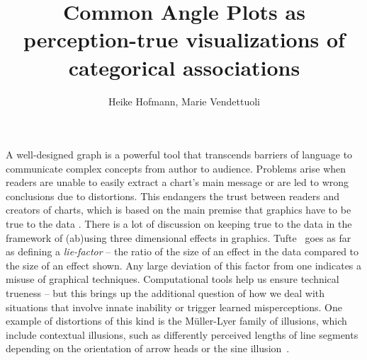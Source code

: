 \documentclass[journal]{vgtc}\usepackage{graphicx, color}
\title{Common Angle Plots as perception-true visualizations of categorical associations}
\author{Heike Hofmann, Marie Vendettuoli}
\begin{document}


\maketitle



% 
% 
% 
% 
A well-designed graph is a powerful tool 
that transcends barriers of language to
communicate complex concepts from author to audience. 
Problems arise when readers are unable to easily extract a chart's main message or are led to wrong conclusions due to distortions.
This endangers the trust between readers and creators of charts, which is based on the main premise that
graphics have to be true to the data \cite{tufte, wainer:2000, robbins:2005}.
There is a lot of discussion on keeping true to the data in the framework of (ab)using three dimensional effects in graphics. Tufte~\cite{tufte} goes as far as defining a {\it lie-factor} -- the ratio of the size of an effect in the data compared to the size of an effect shown. Any large deviation of this factor from one indicates a misuse of graphical techniques. Computational tools help us ensure technical trueness -- but this brings up the additional question of how we deal with situations that involve innate inability or trigger learned misperceptions.
One example of distortions of this kind is the 
 M\"{u}ller-Lyer family of illusions, which include contextual illusions,  such as differently perceived lengths of line segments depending on the orientation of arrow heads  
 or the sine illusion~\cite{day:1991}.
\end{document}

